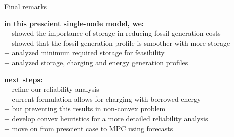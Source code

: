 \documentclass[aspectratio=169,11pt]{beamer}
\begin{document}
\begin{frame}{Final remarks} 
\BIT
\item \textbf{in this prescient single-node model, we:}  \\
\hspace{12mm} $-$ showed the importance of storage in reducing fossil generation costs\\
\hspace{12mm} $-$ showed that the fossil generation profile is smoother with more storage\\
\hspace{12mm} $-$ analyzed minimum required storage for feasibility\\
\hspace{12mm} $-$ analyzed storage, charging and energy generation profiles\\
\item \textbf{next steps:} \\
\hspace{12mm} $-$ refine our reliability analysis\\
\hspace{12mm} $-$ current formulation allows for charging with borrowed energy\\
\hspace{12mm} $-$ but preventing this results in non-convex problem\\
\hspace{12mm} $-$ develop convex heuristics for a more detailed reliability analysis\\
\hspace{12mm} $-$ move on from prescient case to MPC using forecasts\\
\EIT
\end{frame}
    
\end{document}
